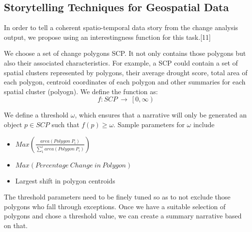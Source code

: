 \documentclass[conference]{IEEEtran}
\begin{document}
\subsection{Storytelling Techniques for Geospatial Data}

In order to tell a coherent spatio-temporal data story from the change analysis output, we propose using an interestingness function for this task.[11]

We choose a set of change polygons SCP. It not only contains those polygons but also their associated characteristics. For example, a SCP could contain a set of spatial clusters represented by polygons, their average drought score, total area of each polygon, centroid coordinates of each polygon and other summaries for each spatial cluster (polyogn). We define the function as:
\[f:SCP\ \rightarrow\ \left[0\right.,\left.\infty\right)\]

We define a threshold $\omega$, which ensures that a narrative will only be generated an object $p \in SCP$ such that $f(p) \ge \omega$. Sample parameters for $\omega$ include  

\begin{itemize}
\item $Max\left(\frac{area\left(Polygon\ P_i\right)}{\sum_{1}^{i}area\left(Polygon\ P_i\right)}\right)$
\item $Max\left(Percentage\ Change\ in\ Polygon\right)$
\item Largest shift in polygon centroids
\end{itemize}

The threshold parameters need to be finely tuned so as to not exclude those polygons who fall through exceptions. Once we have a suitable selection of polygons and chose a threshold value, we can create a summary narrative based on that. 
\end{document}
